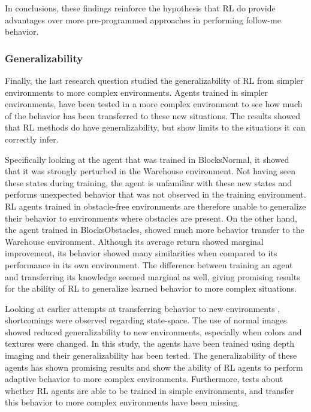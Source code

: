 In conclusions, these findings reinforce the 
hypothesis that RL do provide advantages over more pre-programmed approaches in 
performing follow-me behavior. 

\subsubsection{Generalizability}
Finally, the last research question studied the generalizability of RL from simpler 
environments to more complex environments. Agents trained in simpler environments, have been 
tested in a more complex environment to see how much of the behavior has been transferred 
to these new situations. The results showed that RL methods do 
have generalizability, but show limits to the situations it can correctly infer. 

Specifically looking at the agent that was trained in BlocksNormal, it showed that 
it was strongly perturbed in the Warehouse environment. Not having 
seen these states during training, the agent is unfamiliar with these new states 
and performs unexpected behavior that was not 
observed in the training environment. RL agents trained in obstacle-free environments 
are therefore unable to generalize their behavior to environments where obstacles 
are present. On the other hand, the agent trained in BlocksObstacles, showed much 
more behavior transfer to the Warehouse environment. Although its
average return showed marginal improvement, its behavior showed many similarities 
when compared to its performance in its own environment. The difference between 
training an agent and transferring its knowledge seemed marginal as well, giving 
promising results for the ability of RL to generalize learned behavior to more 
complex situations. 

Looking at earlier attempts at transferring behavior to new environments \cite{DroneRLUsingTransferLearning}, 
shortcomings were observed regarding state-space. The use of normal images 
showed reduced generalizability to new environments, especially when colors and 
textures were changed. In this study, the agents have been trained using depth imaging 
and their generalizability has been tested. The generalizability of these agents has 
shown promising results and show the ability of RL agents to perform adaptive 
behavior to more complex environments. Furthermore, tests about whether RL agents 
are able to be trained in simple environments, and transfer this behavior to more 
complex environments have been missing. 

